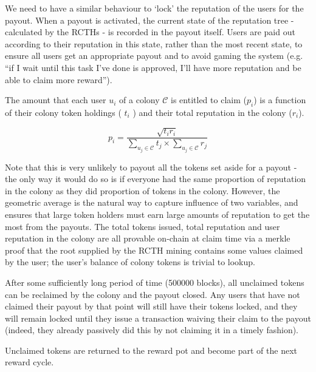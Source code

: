 We need to have a similar behaviour to `lock' the reputation of the users for the payout. When a payout is activated, the current state of the reputation tree - calculated by the RCTHs - is recorded in the payout itself. Users are paid out according to their reputation in this state, rather than the most recent state, to ensure all users get an appropriate payout and to avoid gaming the system (e.g. “if I wait until this task I've done is approved, I'll have more reputation and be able to claim more reward”).

The amount that each user $u_i$ of a colony $\mathcal{C}$ is entitled to claim ($p_i$) is a function of their colony token holdings ( $t_i$ ) and their total reputation in the colony ($r_i$).

\begin{equation}\label{eq:reward-claim}
 p_i = \frac{\sqrt{t_i r_i}}{\sum\limits_{u_j\in \mathcal{C}} t_j \times \sum\limits_{u_j\in \mathcal{C}} r_j}
\end{equation}



Note that this is very unlikely to payout all the tokens set aside for a payout - the only way it would do so is if everyone had the same proportion of reputation in the colony as they did proportion of tokens in the colony. However, the geometric average is the natural way to capture influence of two variables, and ensures that large token holders must earn large amounts of reputation to get the most from the payouts. The total tokens issued, total reputation and user reputation in the colony are all provable on-chain at claim time via a merkle proof that the root supplied by the RCTH mining contains some values claimed by the user; the user's balance of colony tokens is trivial to lookup.

After some sufficiently long period of time (500000 blocks), all unclaimed tokens can be reclaimed by the colony and the payout closed. Any users that have not claimed their payout by that point will still have their tokens locked, and they will remain locked until they issue a transaction waiving their claim to the payout (indeed, they already passively did this by not claiming it in a timely fashion).

Unclaimed tokens are returned to the reward pot and become part of the next reward cycle.